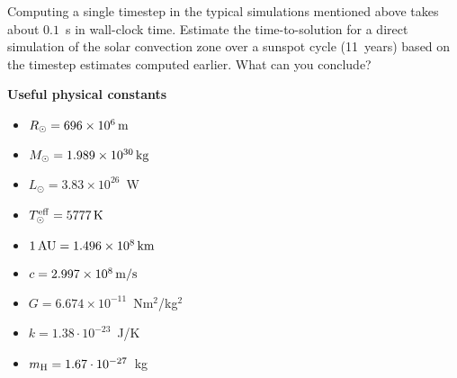 \documentclass[12pt]{article}
\begin{document}
Computing a single timestep in the typical simulations mentioned above
takes about $0.1$~s in wall-clock time. Estimate the time-to-solution
for a direct simulation of the solar convection zone over a sunspot
cycle (11~years) based on the timestep estimates computed
earlier. What can you conclude?


{\bf Useful physical constants}
\begin{itemize}
  \item $R_{\odot} = 696 \times 10^6\,{\rm m}$
  \item $M_{\odot} = 1.989 \times 10^{30}\,{\rm kg}$
  \item $L_{\odot} = 3.83 \times 10^{26}$~W
  \item $T^{\rm eff}_{\odot} = 5777\,{\rm K}$
  \item $1\,{\rm AU} = 1.496 \times 10^8\,{\rm km}$
  \item $c = 2.997 \times 10^8\,{\rm m/s}$
  \item $G = 6.674 \times 10^{-11}$~Nm$^2$/kg$^2$
  \item $k = 1.38\cdot10^{-23}$~J/K
  \item $m_{\rm H} = 1.67\cdot10^{-27}$~kg
\end{itemize}
\end{document}

